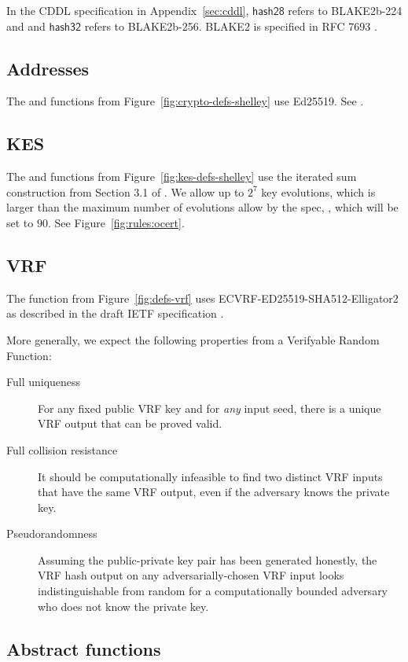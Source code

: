 In the CDDL specification in Appendix~\ref{sec:cddl},
$\mathsf{hash28}$ refers to BLAKE2b-224 and
and $\mathsf{hash32}$ refers to BLAKE2b-256.
BLAKE2 is specified in RFC 7693 \cite{rfcBLAKE2}.

\subsection{Addresses}
\label{sec:app-addresses}
The  and  functions from Figure~\ref{fig:crypto-defs-shelley}
use Ed25519. See \cite{rfcEdDSA}.

\subsection{KES}
The  and  functions from Figure~\ref{fig:kes-defs-shelley}
use the iterated sum construction from Section 3.1 of \cite{cryptoeprint:2001:034}.
We allow up to $2^7$ key evolutions, which is larger than the maximum number
of evolutions allow by the spec, \MaxKESEvo, which will be set to $90$.
See Figure~\ref{fig:rules:ocert}.

\subsection{VRF}
\label{sec:app-vrf}
The  function from Figure~\ref{fig:defs-vrf}
uses ECVRF-ED25519-SHA512-Elligator2 as described in the draft IETF specification
\cite{rfcVRFDraft}.

More generally, we expect the following properties from a Verifyable Random Function: 
\begin{description}
\item[Full uniqueness] For any fixed public VRF key and for \textit{any} input seed, there is a unique VRF output that can be proved valid. 
\item[Full collision resistance] It should be computationally infeasible to find two distinct VRF inputs that have the same VRF output, even if the adversary knows the private key. 
\item[Pseudorandomness] Assuming the public-private key pair has been generated honestly, the VRF hash output on any adversarially-chosen VRF input looks indistinguishable from random for a computationally bounded adversary who does not know the private key. 
\end{description}

\subsection{Abstract functions}
\label{sec:abstract-funcs-implementation}

